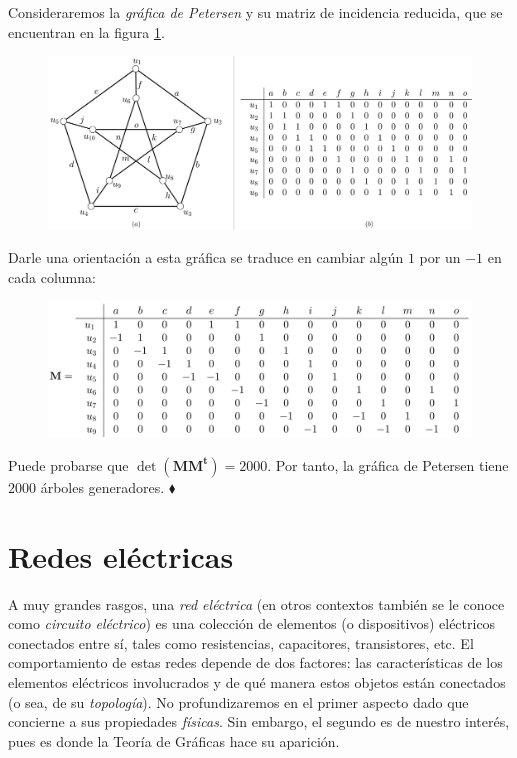 \begin{ejem}
Consideraremos la \textit{gráfica de Petersen} y su matriz de incidencia reducida, que se encuentran en la figura \ref{fig:petersen}.

\begin{figure}[H]
    \centering
    \includegraphics[scale=0.14]{img/imgchapter4/petersen.jpg}
    \caption{}
    \label{fig:petersen}
\end{figure}

Darle una orientación a esta gráfica se traduce en cambiar algún $1$ por un $-1$ en cada columna:

\begin{figure}[H]
    \centering
    \includegraphics[scale=0.16]{img/imgchapter4/petersendirigido.jpg}
    \caption{}
    \label{fig:petersendirigido}
\end{figure}

Puede probarse que $\det(\mathbf{M}\mathbf{M^{t}}) = 2000$. Por tanto, la gráfica de Petersen tiene $2000$ árboles generadores.      
\hfill $\blacklozenge$
\end{ejem}


\section{Redes eléctricas}
A muy grandes rasgos, una \textit{red eléctrica} (en otros contextos también se le conoce como \textit{circuito eléctrico}) es una colección de elementos (o dispositivos) eléctricos conectados entre sí, tales como resistencias, capacitores, transistores, etc. El comportamiento de estas redes depende de dos factores: las características de los elementos eléctricos involucrados y de qué manera estos objetos están conectados (o sea, de su \textit{topología}). No profundizaremos en el primer aspecto dado que concierne a sus propiedades \textit{físicas}. Sin embargo, el segundo es de nuestro interés, pues es donde la Teoría de Gráficas hace su aparición.

